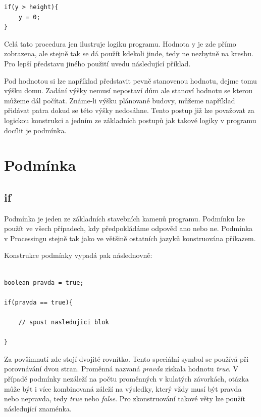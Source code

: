 \documentclass[11pt]{book}
\newcommand{\oddil}[1]{\section{#1}\label{sec:#1}}
\newcommand{\pododdil}[1]{\subsection{#1}\label{subsec:#1}}
\begin{document}
\begin{lstlisting}
if(y > height){
	y = 0;
}
\end{lstlisting}

Celá tato procedura jen ilustruje logiku programu. Hodnota y je zde přímo zobrazena, ale stejně tak se dá použít kdekoli jinde, tedy ne nezbytně na kresbu. Pro lepší představu jiného použití uvedu následující příklad.

Pod hodnotou si lze například představit pevně stanovenou hodnotu, dejme tomu výšku domu. Zadání výšky nemusí nepostaví dům ale stanoví hodnotu se kterou můžeme dál počítat. Známe-li výšku plánované budovy, můžeme například přidávat patra dokud se této výšky nedosáhne. Tento postup již lze považovat za logickou konstrukci a jedním ze základních postupů jak takové logiky v programu docílit je podmínka.

\oddil{Podmínka}


\pododdil{if}

Podmínka je jeden ze základních stavebních kamenů programu. Podmínku lze použít ve všech případech, kdy předpokládáme odpověď ano nebo ne. Podmínka v Processingu stejně tak jako ve většině ostatních jazyků konstruována příkazem.

Konstrukce podmínky vypadá pak následnovně:


\begin{lstlisting}

boolean pravda = true;

if(pravda == true){

    // spust nasledujici blok

}

\end{lstlisting}

Za povšimnutí zde stojí dvojité rovnítko. Tento speciální symbol se používá při porovnávání dvou stran. Proměnná nazvaná {\em pravda} získala hodnotu {\em true}. V případě podmínky nezáleží na počtu proměnných v kulatých závorkách, otázka může být i více kombinovaná záleží na výsledky, který vždy musí být pravda nebo nepravda, tedy {\em true} nebo {\em false}. Pro zkonstruování takové věty lze použít následující znaménka.
\end{document}
